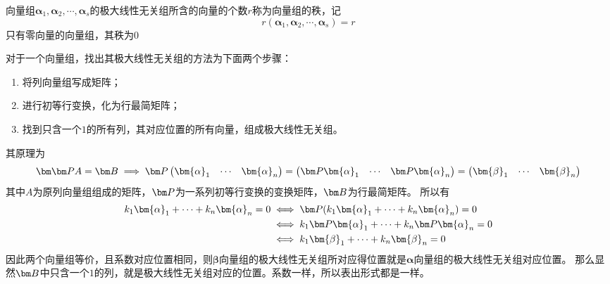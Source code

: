 \begin{definition}
    向量组$\bm{\alpha}_1,\bm{\alpha}_2,\cdots,\bm{\alpha}_s$的极大线性无关组所含的向量的个数$r$称为向量组的秩，记
    \[ r(\bm{\alpha}_1,\bm{\alpha}_2,\cdots,\bm{\alpha}_s) = r \]
    只有零向量的向量组，其秩为$0$
\end{definition}
对于一个向量组，找出其极大线性无关组的方法为下面两个步骤：
\begin{enumerate}
    \item 将列向量组写成矩阵；
    \item 进行初等行变换，化为行最简矩阵；
    \item 找到只含一个$1$的所有列，其对应位置的所有向量，组成极大线性无关组。
\end{enumerate}
其原理为
\[
    \mat{\mat{P}A} = \mat{B}
    \implies \mat{P}
    \begin{pmatrix}
        \bm{\alpha}_1 & \cdots & \bm{\alpha}_n
    \end{pmatrix}
    =
    \begin{pmatrix}
        \mat{P}\bm{\alpha}_1 & \cdots & \mat{P}\bm{\alpha}_n
    \end{pmatrix}
    =
    \begin{pmatrix}
        \bm{\beta}_1 & \cdots & \bm{\beta}_n
    \end{pmatrix}
\]
其中$A$为原列向量组组成的矩阵，$\mat{P}$为一系列初等行变换的变换矩阵，$\mat{B}$为行最简矩阵。
所以有
\begin{align*}
    k_1\bm{\alpha}_1 + \cdots + k_n\bm{\alpha}_n = 0
     & \iff \mat{P}(k_1\bm{\alpha}_1 + \cdots + k_n\bm{\alpha}_n) = 0      \\
     & \iff k_1\mat{P}\bm{\alpha}_1 + \cdots + k_n\mat{P}\bm{\alpha}_n = 0 \\
     & \iff k_1\bm{\beta}_1 + \cdots + k_n\bm{\beta}_n = 0
\end{align*}
因此两个向量组等价，且系数对应位置相同，则$\bm{\beta}$向量组的极大线性无关组所对应得位置就是$\bm{\alpha}$向量组的极大线性无关组对应位置。
那么显然$\mat{B}$中只含一个$1$的列，就是极大线性无关组对应的位置。系数一样，所以表出形式都是一样。

